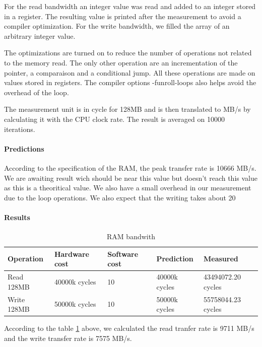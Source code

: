 For the read bandwidth an integer value was read and added to an integer stored in a register.
The resulting value is printed after the measurement to avoid a compiler optimization.
For the write bandwidth, we filled the array of an arbitrary integer value.

The optimizations are turned on to reduce the number of operations not related to the memory read.
The only other operation are an incrementation of the pointer, a comparaison and a conditional jump.
All these operations are made on values stored in registers.
The compiler options -funroll-loops also helps avoid the overhead of the loop.

The measurement unit is in cycle for 128MB and is then translated to MB/s by calculating it with the CPU clock rate.
The result is averaged on 10000 iterations.

\paragraph{Predictions}
According to the specification of the RAM, the peak transfer rate is 10666 MB/s.
We are awaiting result wich should be near this value but doesn't reach this value as this is a theoritical value.
We also have a small overhead in our measurement due to the loop operations. We also expect that the writing takes about 20%

\paragraph{Results}
\begin{table}[h]
\begin{center}
\begin{tabular}{| l | l | l | l | l |}
\hline
Operation 		& Hardware cost & Software cost & Prediction 	& Measured \\
\hline
Read 128MB 	& 40000k cycles	& 10			& 40000k cycles	& 43494072.20 cycles \\
\hline
Write 128MB 	& 50000k cycles	& 10			& 50000k cycles	& 55758044.23 cycles \\
\hline

\end{tabular}
\end{center}

\caption{RAM bandwith\label{tab:ram-bandwidth}}
\end{table}

According to the table \ref {tab:ram-bandwidth} above, we calculated the read tranfer rate is 9711 MB/s and the write transfer rate is 7575 MB/s.

